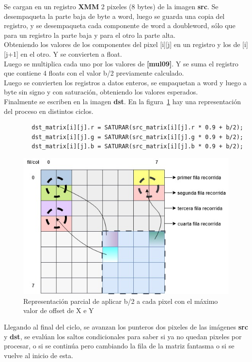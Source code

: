 Se cargan en un registro \textbf{XMM} 2 pixeles (8 bytes) de la imagen \textbf{src}.
Se desempaqueta la parte baja de byte a word, luego se guarda una copia del registro, y se desempaqueta cada componente de word a doubleword, sólo que para un registro la parte baja y para el otro la parte alta. \\
Obteniendo los valores de los componentes del pixel [i][j] en un registro y los de [i][j+1] en el otro. Y se convierten a float. \\
Luego se multiplica cada uno por los valores de \textbf{[mul09]}. 
Y se suma el registro que contiene 4 floats con el valor b/2 previamente calculado. \\
Luego se convierten los registros a datos enteros, se empaquetan a word y luego a byte sin signo y con saturación, obteniendo los valores esperados. \\
Finalmente se escriben en la imagen \textbf{dst}. En la figura~\ref{calcb} hay una representación del proceso en distintos ciclos. \\
\begin{codesnippet}
\begin{verbatim}
        dst_matrix[i][j].r = SATURAR(src_matrix[i][j].r * 0.9 + b/2);
        dst_matrix[i][j].g = SATURAR(src_matrix[i][j].g * 0.9 + b/2);
        dst_matrix[i][j].b = SATURAR(src_matrix[i][j].b * 0.9 + b/2);
\end{verbatim}
\end{codesnippet}
\begin{figure}[ht]
  \begin{center}
	\includegraphics[scale=0.5]{img/fantasma1.jpg}
	\caption{Representación parcial de aplicar b/2 a cada pixel con el máximo valor de offset de X e Y}
	\label{calcb}
  \end{center}
\end{figure}

Llegando al final del ciclo, se avanzan los punteros dos pixeles de las imágenes \textbf{src} y \textbf{dst}, se evalúan los saltos condicionales para saber si ya no quedan pixeles por procesar, o si se continúa pero cambiando la fila de la matriz fantasma o si se vuelve al inicio de esta.

\newpage